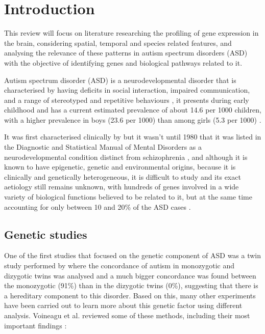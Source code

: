 \section{Introduction}\label{Intro}

This review will focus on literature researching the profiling of gene expression in the brain, considering spatial, temporal and species related features, and analysing the relevance of these patterns in autism spectrum disorders (ASD) with the objective of identifying genes and biological pathways related to it.

Autism spectrum disorder (ASD) is a neurodevelopmental disorder that is characterised by having deficits in social interaction, impaired communication, and a range of stereotyped and repetitive behaviours \cite{lord_autism_1994}, it presents during early childhood and has a current estimated prevalence of about 14.6 per 1000 children, with a higher prevalence in boys (23.6 per 1000) than among girls (5.3 per 1000) \cite{christensen_prevalence_2016}.

It was first characterised clinically by \cite{kanner_original_1943} but it wasn't until 1980 that it was listed in the Diagnostic and Statistical Manual of Mental Disorders \cite{american_diagnostic_1980} as a neurodevelopmental condition distinct from schizophrenia \cite{voineagu_gene_2012}, and although it is known to have epigenetic, genetic and environmental origins, because it is clinically and genetically heterogeneous, it is difficult to study and its exact aetiology still remains unknown, with hundreds of genes involved in a wide variety of biological functions believed to be related to it, but at the same time accounting for only between 10 and 20\% of the ASD cases \cite{abrahams_advances_2008}.

\subsection{Genetic studies}
One of the first studies that focused on the genetic component of ASD was a twin study performed by \cite{steffenburg_twin_1989} where the concordance of autism in monozygotic and dizygotic twins was analysed and a much bigger concordance was found between the monozygotic (91\%) than in the dizygotic twins (0\%), suggesting that there is a hereditary component to this disorder. Based on this, many other experiments have been carried out to learn more about this genetic factor using different analysis. Voineagu et al. reviewed some of these methods, including their most important findings \cite{voineagu_gene_2012}:

